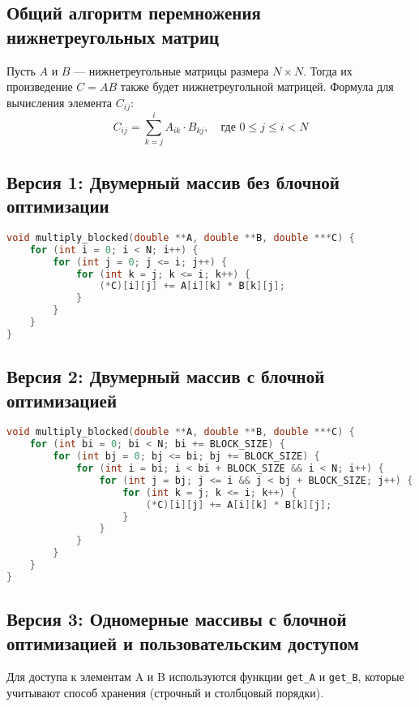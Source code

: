 \documentclass[14pt, russian]{matmex-diploma-custom}
\begin{document}
\subsection{Общий алгоритм перемножения нижнетреугольных матриц}
Пусть $A$ и $B$ — нижнетреугольные матрицы размера $N \times N$. Тогда их произведение $C = AB$ также будет нижнетреугольной матрицей. Формула для вычисления элемента $C_{ij}$:
\begin{equation}
C_{ij} = \sum_{k=j}^{i} A_{ik} \cdot B_{kj}, \quad \text{где } 0 \leq j \leq i < N
\end{equation}

\subsection{Версия 1: Двумерный массив без блочной оптимизации}
{\footnotesize
\begin{lstlisting}[language=C, caption={Алгоритм перемножения без блокировки для двумерных массивов}]
void multiply_blocked(double **A, double **B, double ***C) {
    for (int i = 0; i < N; i++) {
        for (int j = 0; j <= i; j++) {
            for (int k = j; k <= i; k++) {
                (*C)[i][j] += A[i][k] * B[k][j];
            }
        }
    }
}
\end{lstlisting}
}

\subsection{Версия 2: Двумерный массив с блочной оптимизацией}
{\footnotesize
\begin{lstlisting}[language=C, caption={Алгоритм перемножения с блокировкой для двумерных массивов}]
void multiply_blocked(double **A, double **B, double ***C) {
    for (int bi = 0; bi < N; bi += BLOCK_SIZE) {
        for (int bj = 0; bj <= bi; bj += BLOCK_SIZE) {
            for (int i = bi; i < bi + BLOCK_SIZE && i < N; i++) {
                for (int j = bj; j <= i && j < bj + BLOCK_SIZE; j++) {
                    for (int k = j; k <= i; k++) {
                        (*C)[i][j] += A[i][k] * B[k][j];
                    }
                }
            }
        }
    }
}
\end{lstlisting}
}

\subsection{Версия 3: Одномерные массивы с блочной оптимизацией и пользовательским доступом}
Для доступа к элементам A и B используются функции \texttt{get\_A} и \texttt{get\_B}, которые учитывают способ хранения (строчный и столбцовый порядки).
\end{document}
